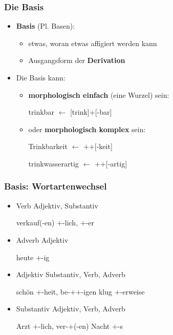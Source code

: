 \begin{frame}
\frametitle{Die Basis}

\begin{itemize}
	\item \textbf{Basis} (Pl. Basen):
	
	\begin{itemize}
		\item etwas, woran etwas affigiert werden kann
		\item Ausgangsform der \textbf{Derivation}
	\end{itemize}
	
	\item Die Basis kann:
	
	\begin{itemize}
		\item \textbf{morphologisch einfach} (eine Wurzel) sein:
		
		\ea trinkbar $\leftarrow$  [trink]$+$[-bar]
		\z
		
		\item oder \textbf{morphologisch komplex} sein:

		\settowidth{} 		
		
		
		\ea Trinkbarkeit $\leftarrow$  \alertred{[[trink]}$+$\alertred{[-bar]]}$+$[-keit] 

		\ex trinkwasserartig $\leftarrow$  \alertred{[[trink]}$+$\alertred{[wasser]]}$+$[-artig]  
		\z
		
	\end{itemize}
	
\end{itemize}


\end{frame}



\begin{frame}
\frametitle{Basis: Wortartenwechsel}

	\begin{itemize}
		\item Verb \ras Adjektiv, Substantiv
		
		\ea verkauf(-en) \ras {}$+$-lich, $+$-er
		\z
		
		\item Adverb \ras Adjektiv
		
		\ea heute \ras {}$+$-ig
		\z
		
		\item Adjektiv \ras Substantiv, Verb, Adverb
		
		\eal 
			\ex schön \ras {}$+$-heit, be-$+$$+$-igen
			\ex klug \ras {}$+$-erweise
		\zl
		
		\item Substantiv \ras Adjektiv, Verb, Adverb

		\eal 
			\ex Arzt \ras {}$+$-lich, ver-$+$(-en)
			\ex Nacht \ras {}$+$-s
		\zl
		
	\end{itemize}
	
\end{frame}


